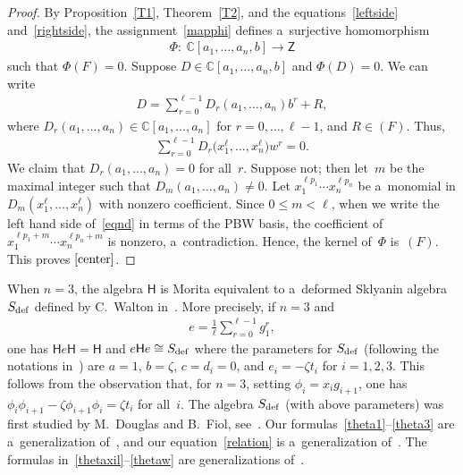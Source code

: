 \documentclass[pdftex]{sigma}
\numberwithin{equation}{section}
\begin{document}
\begin{proof}
By Proposition~\ref{T1}, Theorem~\ref{T2}, and the equations~\eqref{leftside} and~\eqref{rightside}, the
assignment~\eqref{mapphi} def\/ines a~surjective homomorphism
\begin{gather*}
\Phi: \  {\mathbb{C}}[a_1,\ldots, a_n,b] \to \mathsf{Z}
\end{gather*}
such that $\Phi(F)=0$.
Suppose $D\in {\mathbb{C}}[a_1,\ldots, a_n,b]$ and $\Phi(D)=0$.
We can write
\begin{gather*}
D = \sum\limits_{r=0}^{\ell-1} D_r(a_1,\dots,a_n) b^r + R,
\end{gather*}
where $D_r (a_1,\dots,a_n) \in {\mathbb{C}}[a_1,\ldots, a_n]$ for $r=0,\ldots, \ell-1$, and $R\in (F)$.
Thus,
\begin{gather}
\label{eqnd}
\sum\limits_{r=0}^{\ell-1} D_r \big(x_1^\ell,\dots, x_n^\ell\big) w^r = 0.
\end{gather}
We claim that $D_r(a_1,\dots,a_n)=0$ for all~$r$.
Suppose not; then let~$m$ be the maximal integer such that $D_m(a_1,\dots,a_n)\neq 0$.
Let $x_1^{\ell p_1} \cdots x_n^{\ell p_n}$ be a~monomial in $D_m(x_1^\ell,\dots, x_n^\ell)$ with nonzero coef\/f\/icient.
Since $0\le m<\ell$, when we write the left hand side of~\eqref{eqnd} in terms of the PBW basis, the coef\/f\/icient of
$x_1^{\ell p_1+m} \cdots x_n^{\ell p_n+m}$ is nonzero, a~contradiction.
Hence, the kernel of~$\Phi$ is~$(F)$.
This proves $\eqref{center}$.
\end{proof}

\begin{Remark}
When $n=3$, the algebra $\mathsf{H}$ is Morita equivalent to a~deformed Sklyanin algebra~$S_{\rm def}$ def\/ined by C.~Walton
in~\cite[Def\/inition~IV.2]{Wa}.
More precisely, if $n=3$ and
\begin{gather*}
e= \frac{1}{\ell} \sum\limits_{r=0}^{\ell-1}g_1^r,
\end{gather*}
one has $\mathsf{H}e\mathsf{H} = \mathsf{H}$ and $e\mathsf{H}e \cong S_{\rm def}$ where the parameters for $S_{\rm def}$
(following the notations in~\cite[Def\/inition~IV.2]{Wa}) are $a=1$, $b=\zeta$, $c=d_i=0$, and $e_i=-\zeta t_i$ for $i=1,2,3$.
This follows from the observation that, for $n=3$, setting $\phi_i = x_i g_{i+1}$, one has $\phi_i\phi_{i+1} - \zeta
\phi_{i+1}\phi_i = \zeta t_i$ for all~$i$.
The algebra $S_{\rm def}$ (with above parameters) was f\/irst studied by M.~Douglas and B.~Fiol, see~\cite[(3.10)]{DF}.
Our formulas~\eqref{theta1}--\eqref{theta3} are a~generalization of~\cite[(4.6)]{DF}, and our equation~\eqref{relation}
is a~generalization of~\cite[(4.7)]{DF}.
The formulas in~\eqref{thetaxil}--\eqref{thetaw} are generalizations of~\cite[(4.8)]{DF}.
\end{Remark}
\end{document}
